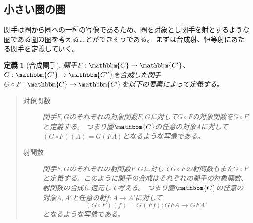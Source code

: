 \documentclass[dvipdfmx]{jsarticle}
\newcommand{\cat}[1]{\mathbbm{#1}}
\newcommand{\arrow}{\rightarrow}
\newcommand{\functor}[3]{#1:\cat{#2}\arrow \cat{#3}}
\newcommand{\mor}[3]{#1:#2\arrow #3}
\newtheorem{define}{定義}[section]
\numberwithin{proof}{subsection}
\numberwithin{prop}{subsection}
\numberwithin{define}{subsection}
\begin{document}
	\subsection{小さい圏の圏}
	関手は圏から圏への一種の写像であるため、圏を対象とし関手を射とするような圏である圏の圏を考えることができそうである。
	まずは合成射、恒等射にあたる関手を定義していく。
	\begin{define}[合成関手]
		関手$\functor{F}{C}{C'}$、$\functor{G}{C'}{C''}$を合成した関手$\functor{G\circ F}{C}{C'}$を以下の要素によって定義する。
		\begin{quote}
			\begin{description}
			\item[対象関数]関手$F,G$のそれぞれの対象関数$F,G$に対して$G\circ F$の対象関数を$G\circ F$と定義する。
			つまり圏$\cat{C}$の任意の対象$A$に対して$(G\circ F)(A)=G(FA)$となるような写像である。
			\item[射関数]関手$F,G$のそれぞれの射関数$F,G$に対して$G\circ F$の射関数もまた$G\circ F$と定義する。このように関手の合成はそれぞれの関手の対象関数、射関数の合成に還元して考える。
			つまり圏$\cat{C}$の任意の対象$A,A'$と任意の射$\mor{f}{A}{A'}$に対して\[\mor{(G\circ F)(f)=G(Ff)}{GFA}{GF{A'}}\]となるような写像である。
			\begin{center}
\end{center}
\end{description}
\end{quote}
\end{define}
\end{document}
